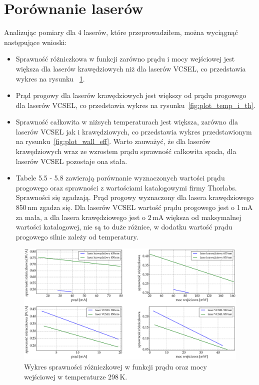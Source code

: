 \section{Porównanie laserów}
Analizując pomiary dla 4 laserów, które przeprowadziłem, można wyciągnąć następujące wnioski:
\begin{itemize}
\item Sprawność różniczkowa w funkcji zarówno prądu i mocy wejściowej jest większa dla laserów krawędziowych niż dla laserów
VCSEL, co przedstawia wykres na rysunku ~\ref{fig:plot_eff}.
\item Prąd progowy dla laserów krawędziowych jest większy od prądu progowego dla laserów VCSEL, co przedstawia wykres
na rysunku~\ref{fig:plot_temp_i_th}.
\item Sprawność całkowita w niżsych temperaturach jest większa, zarówno dla laserów VCSEL jak i krawędziowych, co przedstawia
wykres przedstawionym na rysunku~\ref{fig:plot_wall_eff}. Warto zauważyć, że dla laserów krawędziowych wraz ze wzrostem prądu
sprawność całkowita spada, dla laserów VCSEL pozostaje ona stała.
\item Tabele 5.5 - 5.8 zawierają porównanie wyznaczonych wartości prądu progowego oraz sprawności z wartościami katalogowymi
firmy Thorlabs. Sprawności się zgadzają. Prąd progowy wyznaczony dla lasera krawędziowego 850\,nm zgadza się. Dla laserów VCSEL
wartość prądu progowego jest o 1\,mA za mała, a dla lasera krawędziowego jest o 2\,mA większa od maksymalnej wartości katalogowej, nie są to
duże różnice, w dodatku wartość prądu progowego silnie zależy od temperatury.
\end{itemize}
\begin{figure}[H]
\center
  \includegraphics[scale=0.30]{plot_common/plot_eff.eps}
  \caption{Wykres sprawności różniczkowej w funkcji prądu oraz mocy wejściowej w temperaturze 298\,K.}
  \label{fig:plot_eff}
\end{figure}
